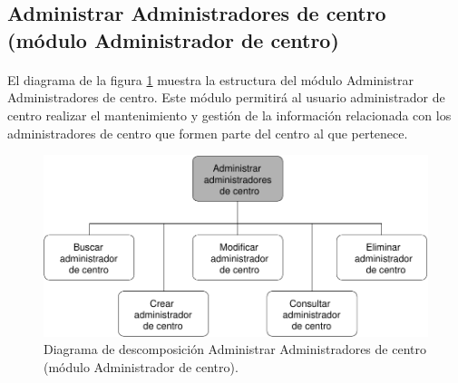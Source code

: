 \subsection{Administrar Administradores de centro (módulo Administrador de centro)}

  \paragraph{}El diagrama de la figura
  \ref{diagramaDescomposicionAdministrarAdministradoresCentro-admCentro} muestra
  la estructura del módulo Administrar Administradores de centro. Este módulo
  permitirá al usuario administrador de centro realizar el mantenimiento y
  gestión de la información relacionada con los administradores de centro que
  formen parte del centro al que pertenece.

  \begin{figure}[!ht]
    \begin{center}
      \includegraphics[]{11.Disenyo_Arquitectonico/11.2.Diagramas_Descomposicion/11.2.3.Modulo_administrador_centro/AdministrarBBDD/AdministrarUsuarios/AdministrarAdministradoresCentro/Diagramas/administrar_administradores_centro.pdf}
      \caption{Diagrama de descomposición Administrar Administradores de centro (módulo Administrador de centro).}
      \label{diagramaDescomposicionAdministrarAdministradoresCentro-admCentro}
    \end{center}
  \end{figure}

